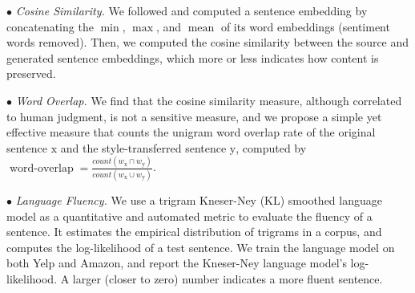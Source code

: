 \documentclass[letterpaper]{article} %
\newcommand{\citeay}[1]{\citeauthor{#1} \shortcite{#1}}
\begin{document}
$\bullet$ \textit{Cosine Similarity.}
We followed \citeay{fu2018style} and computed a sentence embedding by concatenating the $\operatorname{min}$, $\operatorname{max}$, and $\operatorname{mean}$ of its word embeddings (sentiment words removed).
Then, we computed the cosine similarity between the source and generated sentence embeddings, which more or less indicates how content is preserved.

$\bullet$ \textit{Word Overlap.} We find that the cosine similarity measure, although correlated to human judgment, is not a sensitive measure, and we propose a simple yet effective measure that counts the unigram word overlap rate of the original sentence $\mathrm x$ and the style-transferred sentence $\mathrm y$, computed by $\operatorname{word-overlap} = \frac{count(w_{\mathrm x} \cap w_{\mathrm y})}{count(w_{\mathrm x} \cup w_{\mathrm y})}$.




$\bullet$ \textit{Language Fluency.}
We use a trigram Kneser-Ney (KL) smoothed language model \cite{kneser1995improved} as a quantitative and automated metric to evaluate the fluency of a sentence.
It estimates the empirical distribution of trigrams in a corpus, and computes the log-likelihood of a test sentence.
We train the language model on both Yelp and Amazon, and report the Kneser-Ney language model's log-likelihood. A larger (closer to zero) number indicates a more fluent sentence.
\end{document}
